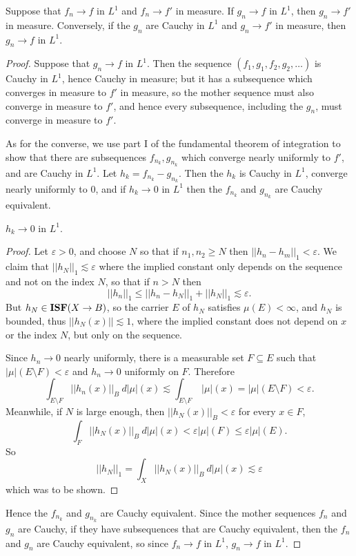 \begin{theorem}
Suppose that $f_{n} \to f$ in $L^1$ and $f_{n} \to f'$ in measure.
If $g_{n} \to f$ in $L^1$, then $g_{n} \to f'$ in measure.
Conversely, if the $g_{n}$ are Cauchy in $L^1$ and $g_{n} \to f'$ in measure, then $g_{n} \to f$ in $L^1$.
\end{theorem}
\begin{proof}
Suppose that $g_{n} \to f$ in $L^1$.
Then the sequence $(f_1, g_1, f_2, g_2, \dots)$ is Cauchy in $L^1$, hence Cauchy in measure; but it has a subsequence which converges in measure to $f'$ in measure, so the mother sequence must also converge in measure to $f'$, and hence every subsequence, including the $g_{n}$, must converge in measure to $f'$.

As for the converse, we use part I of the fundamental theorem of integration to show that there are subsequences $f_{n_{k}}, g_{n_{k}}$ which converge nearly uniformly to $f'$, and are Cauchy in $L^1$.
Let $h_{k} = f_{n_{k}} - g_{n_{k}}$. Then the $h_{k}$ is Cauchy in $L^1$, converge nearly uniformly to $0$, and if $h_{k} \to 0$ in $L^1$ then the $f_{n_{k}}$ and $g_{n_{k}}$ are Cauchy equivalent.
\begin{lemma}
$h_{k} \to 0$ in $L^1$.
\end{lemma}
\begin{proof}
Let $\varepsilon > 0$, and choose $N$ so that if $n_1, n_2 \geq N$ then $||h_{n} - h_{m}||_1 < \varepsilon$. We claim that $||h_N||_1 \lesssim \varepsilon$ where the implied constant only depends on the sequence and not on the index $N$, so that if $n > N$ then
\[||h_{n}||_1 \leq ||h_{n} - h_N||_1 + ||h_N||_1 \lesssim \varepsilon.\]
But $h_{N} \in \mathbf{ISF}(X \to B)$, so the carrier $E$ of $h_N$ satisfies $\mu(E) < \infty$, and $h_N$ is bounded, thus $||h_N(x)|| \lesssim 1$, where the implied constant does not depend on $x$ or the index $N$, but only on the sequence.

Since $h_{n} \to 0$ nearly uniformly, there is a measurable set $F \subseteq E$ such that $|\mu|(E \setminus F) < \varepsilon$ and $h_{n} \to 0$ uniformly on $F$. Therefore
\[\int_{E \setminus F} ||h_{n}(x)||_{B} ~d|\mu|(x) \lesssim \int_{E \setminus F} ~|\mu|(x) = |\mu|(E \setminus F) < \varepsilon.\]
Meanwhile, if $N$ is large enough, then $||h_N(x)||_{B} < \varepsilon$ for every $x \in F$,
\[\int_{F} ||h_N(x)||_B~d|\mu|(x) < \varepsilon |\mu|(F) \leq \varepsilon |\mu|(E).\]
So
\[||h_N||_1 = \int_{X} ||h_N(x)||_{B} ~d|\mu|(x) \lesssim \varepsilon\]
which was to be shown.
\end{proof}

Hence the $f_{n_{k}}$ and $g_{n_{k}}$ are Cauchy equivalent.
Since the mother sequences $f_{n}$ and $g_{n}$ are Cauchy, if they have subsequences that are Cauchy equivalent, then the $f_{n}$ and $g_{n}$ are Cauchy equivalent, so since $f_{n} \to f$ in $L^1$, $g_{n} \to f$ in $L^1$.
\end{proof}

